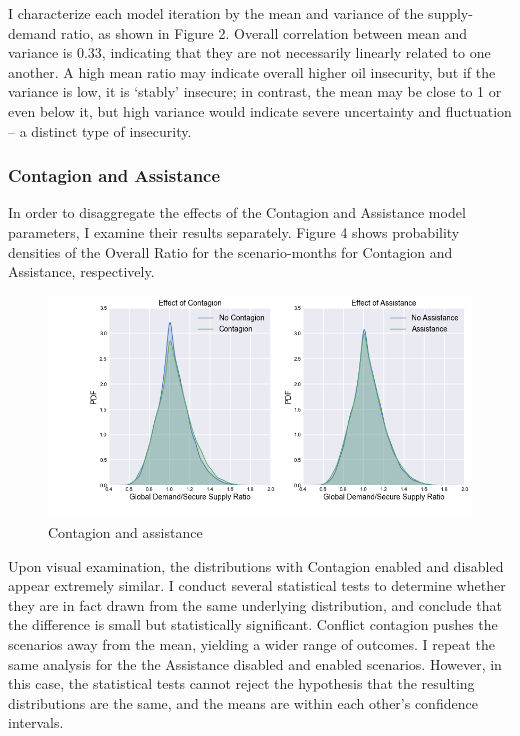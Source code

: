 \documentclass{llncs}
\begin{document}
I characterize each model iteration by the mean and variance of the supply-demand ratio, as shown in Figure 2. Overall correlation between mean and variance is 0.33, indicating that they are not necessarily linearly related to one another. A high mean ratio may indicate overall higher oil insecurity, but if the variance is low, it is `stably' insecure; in contrast, the mean may be close to 1 or even below it, but high variance would indicate severe uncertainty and fluctuation -- a distinct type of insecurity. 

\subsubsection{Contagion and Assistance}

In order to disaggregate the effects of the Contagion and Assistance model parameters, I examine their results separately. Figure 4 shows probability densities of the Overall Ratio for the scenario-months for Contagion and Assistance, respectively.

\begin{figure}[h!]
	\centering
	\includegraphics[width=\textwidth]{../Graphics/ContagionAndAssistance}
	\caption{Contagion and assistance}
\end{figure}

Upon visual examination, the distributions with Contagion enabled and disabled appear extremely similar. I conduct several statistical tests to determine whether they are in fact drawn from the same underlying distribution, and conclude that the difference is small but statistically significant. Conflict contagion pushes the scenarios away from the mean, yielding a wider range of outcomes. I repeat the same analysis for the the Assistance disabled and enabled scenarios. However, in this case, the statistical tests cannot reject the hypothesis that the resulting distributions are the same, and the means are within each other's confidence intervals.
\end{document}
